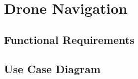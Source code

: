 \section{Drone Navigation}

\subsection{Functional Requirements}

	\begin{flushleft}


	\end{flushleft}

\subsection{Use Case Diagram}
